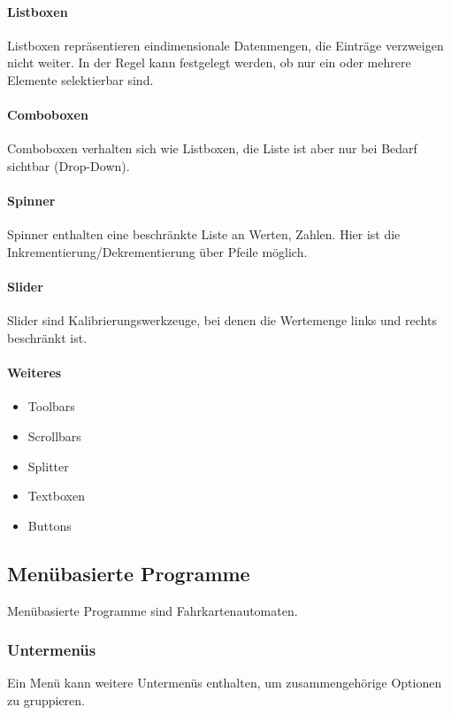 				\paragraph{Listboxen}
					Listboxen repräsentieren eindimensionale Datenmengen, \dh die Einträge verzweigen nicht weiter. In der Regel kann festgelegt werden, ob nur ein oder mehrere Elemente selektierbar sind.

				\paragraph{Comboboxen}
					Comboboxen verhalten sich wie Listboxen, die Liste ist aber nur bei Bedarf sichtbar (Drop-Down).

				\paragraph{Spinner}
					Spinner enthalten eine beschränkte Liste an Werten, \zB Zahlen. Hier ist die Inkrementierung/Dekrementierung über Pfeile möglich.

				\paragraph{Slider}
					Slider sind Kalibrierungswerkzeuge, bei denen die Wertemenge links und rechts beschränkt ist.

				\paragraph{Weiteres}
					\begin{itemize}
						\item Toolbars
						\item Scrollbars
						\item Splitter
						\item Textboxen
						\item Buttons
					\end{itemize}

		\subsection{Menübasierte Programme}
			Menübasierte Programme sind \zB Fahrkartenautomaten.

			\subsubsection{Untermenüs}
				Ein Menü kann weitere Untermenüs enthalten, um zusammengehörige Optionen zu gruppieren.
			
